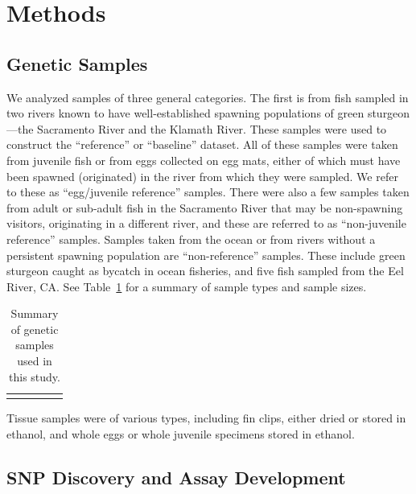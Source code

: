 \section{Methods}



\subsection{Genetic Samples}

We analyzed samples of three general categories. The first is from fish sampled in
two rivers known to have well-established spawning populations of green
sturgeon---the Sacramento River and the Klamath River. These samples were used to
construct the ``reference'' or ``baseline'' dataset. All of these samples were taken
from juvenile fish or from eggs collected on egg mats, either of which must have
been spawned (originated) in the river from which they were sampled. We refer to
these as ``egg/juvenile reference'' samples. There were also a few samples taken
from adult or sub-adult fish in the Sacramento River that may be non-spawning
visitors, originating in a different river, and these are referred to as
``non-juvenile reference'' samples. Samples taken from the ocean or from rivers
without a persistent spawning population are ``non-reference''
samples. These include green sturgeon caught as bycatch in ocean fisheries, and
five fish sampled from the Eel River, CA. See Table~\ref{tab:samps} for a summary of sample
types and sample sizes. 
\begin{table}
\caption{Summary of genetic samples used in this study.}
\begin{center}
\begin{tabular}{llllr}
\hline \hline \\ 

\hline \hline \\ 
\end{tabular}
\end{center}
\label{tab:samps}
\end{table}
Tissue samples were of various types, including fin clips, either dried or 
stored in ethanol, and whole eggs or whole
juvenile specimens stored in ethanol.


\subsection{SNP Discovery and Assay Development}

